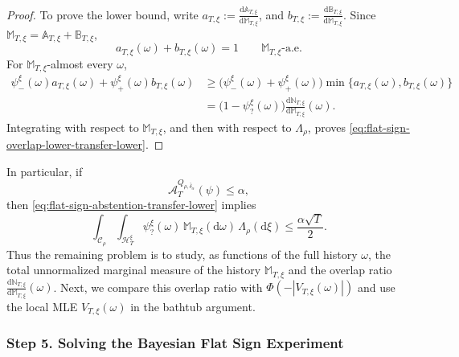 \documentclass[10pt]{article}
\newcommand{\dd}{\mathrm{d}}
\theoremstyle{plain}
\begin{document}
\begin{proof}
To prove the lower bound, write
    $a_{T,\xi}
    :=
    \frac{\dd\mathbb A_{T,\xi}}
         {\dd\mathbb M_{T,\xi}}$,
    and
    $b_{T,\xi}
    :=
    \frac{\dd\mathbb B_{T,\xi}}
         {\dd\mathbb M_{T,\xi}}$.
Since
$\mathbb M_{T,\xi}=\mathbb A_{T,\xi}+\mathbb B_{T,\xi}$,
\[
    a_{T,\xi}(\omega)+b_{T,\xi}(\omega)
    =
    1
    \qquad
    \mathbb M_{T,\xi}\text{-a.e.}
\]
For $\mathbb M_{T,\xi}$-almost every $\omega$,
\[
\begin{aligned}
    \psi_-^\xi(\omega)a_{T,\xi}(\omega)
    +
    \psi_+^\xi(\omega)b_{T,\xi}(\omega)
    &\ge
    \bigl(
        \psi_-^\xi(\omega)
        +
        \psi_+^\xi(\omega)
    \bigr)
    \min\{
        a_{T,\xi}(\omega),
        b_{T,\xi}(\omega)
    \}\\
    &=
    \bigl(
        1-\psi_?^\xi(\omega)
    \bigr)
    \frac{\dd\mathbb N_{T,\xi}}
         {\dd\mathbb M_{T,\xi}}(\omega).
\end{aligned}
\]
Integrating with respect to $\mathbb M_{T,\xi}$, and then with respect to
$\Lambda_\rho$, proves
\eqref{eq:flat-sign-overlap-lower-transfer-lower}. 
\end{proof}

In particular, if
\[
    \mathcal A_T^{Q_{\rho,\bar\delta_\alpha}}(\psi)
    \le
    \alpha,
\]
then \eqref{eq:flat-sign-abstention-transfer-lower} implies
\begin{equation}
\label{eq:flat-sign-abstention-budget-transfer-lower}
    \int_{\mathcal C_\rho}
    \int_{\mathcal H_T^\xi}
        \psi_?^\xi(\omega)
    \,\mathbb M_{T,\xi}(\dd\omega)\,
    \Lambda_\rho(\dd\xi)
    \le
    \frac{\alpha\sqrt T}{2}.
\end{equation}
Thus the remaining problem is to study, as functions of the full history
$\omega$, the total unnormalized marginal measure of the history $\mathbb M_{T,\xi}$ and the overlap ratio
    $\frac{\dd\mathbb N_{T,\xi}}
         {\dd\mathbb M_{T,\xi}}(\omega)$.
Next, we compare this overlap ratio with
$\Phi(-|V_{T,\xi}(\omega)|)$ and use the local MLE
$V_{T,\xi}(\omega)$ in the bathtub argument.








\subsubsection{Step 5. Solving the Bayesian Flat Sign Experiment}
\end{document}
